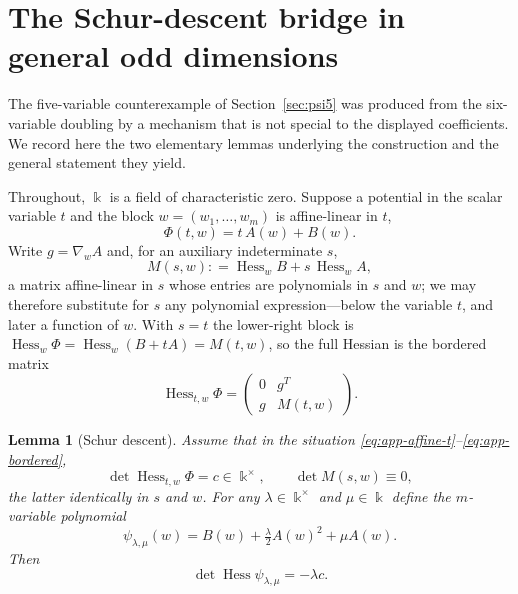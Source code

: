 \documentclass[11pt]{article}
\theoremstyle{plain}
\newtheorem{lemma}[theorem]{Lemma}
\theoremstyle{definition}
\newcommand{\kk}{\Bbbk}
\newcommand{\Hess}{\operatorname{Hess}}
\providecommand{\coloneqq}{\mathrel{\mathop:}=}
\begin{document}
\appendix
\section{The Schur-descent bridge in general odd dimensions}
\label{app:schur}

The five-variable counterexample of Section~\ref{sec:psi5} was produced from the
six-variable doubling by a mechanism that is not special to the displayed
coefficients. We record here the two elementary lemmas underlying the
construction and the general statement they yield.

Throughout, $\kk$ is a field of characteristic zero. Suppose a potential
in the scalar variable $t$ and the block $w=(w_1,\dots,w_m)$ is
affine-linear in $t$,
\begin{equation}
\Phi(t,w)=t\,A(w)+B(w).
\label{eq:app-affine-t}
\end{equation}
Write $g=\nabla_w A$ and, for an auxiliary indeterminate $s$,
\[
M(s,w)\coloneqq\Hess_w B+s\,\Hess_w A,
\]
a matrix affine-linear in $s$ whose entries are polynomials in $s$ and
$w$; we may therefore substitute for $s$ any polynomial expression---below
the variable $t$, and later a function of $w$. With $s=t$ the lower-right
block is $\Hess_w\Phi=\Hess_w(B+tA)=M(t,w)$, so the full Hessian is the
bordered matrix
\begin{equation}
\Hess_{t,w}\Phi=
\begin{pmatrix}
0 & g^{T}\\
g & M(t,w)
\end{pmatrix}.
\label{eq:app-bordered}
\end{equation}

\begin{lemma}[Schur descent]
\label{lem:schur}
Assume that in the situation \eqref{eq:app-affine-t}--\eqref{eq:app-bordered},
\[
\det\Hess_{t,w}\Phi=c\in\kk^{\times},
\qquad
\det M(s,w)\equiv0 ,
\]
the latter identically in $s$ and $w$.
For any $\lambda\in\kk^{\times}$ and $\mu\in\kk$ define the
$m$-variable polynomial
\begin{equation}
\psi_{\lambda,\mu}(w)=B(w)+\tfrac{\lambda}{2}A(w)^{2}+\mu A(w).
\label{eq:app-psi}
\end{equation}
Then
\begin{equation}
\det\Hess\psi_{\lambda,\mu}=-\lambda c .
\label{eq:app-descent}
\end{equation}
\end{lemma}
\end{document}
